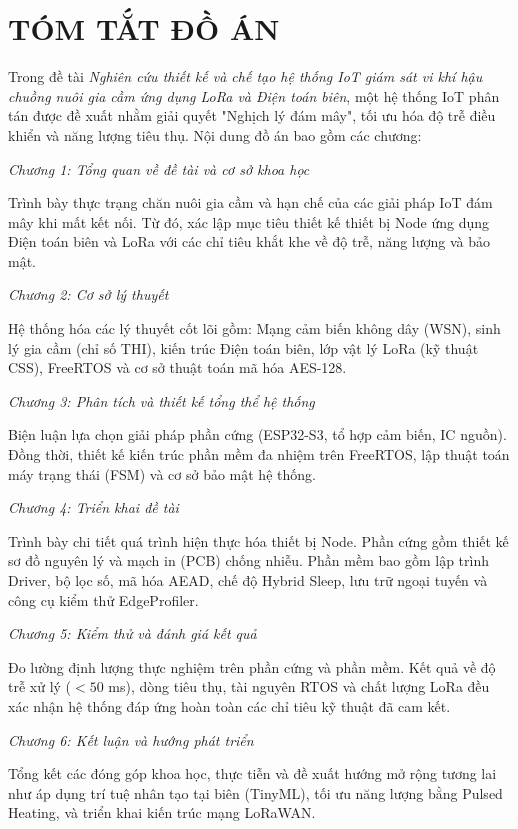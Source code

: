 \section*{TÓM TẮT ĐỒ ÁN}

Trong đề tài \textit{Nghiên cứu thiết kế và chế tạo hệ thống IoT giám sát vi khí hậu chuồng nuôi gia cầm ứng dụng LoRa và Điện toán biên}, một hệ thống IoT phân tán được đề xuất nhằm giải quyết "Nghịch lý đám mây", tối ưu hóa độ trễ điều khiển và năng lượng tiêu thụ. Nội dung đồ án bao gồm các chương: 

\textit{Chương 1: Tổng quan về đề tài và cơ sở khoa học}

Trình bày thực trạng chăn nuôi gia cầm và hạn chế của các giải pháp IoT đám mây khi mất kết nối. Từ đó, xác lập mục tiêu thiết kế thiết bị Node ứng dụng Điện toán biên và LoRa với các chỉ tiêu khắt khe về độ trễ, năng lượng và bảo mật.

\textit{Chương 2: Cơ sở lý thuyết}

Hệ thống hóa các lý thuyết cốt lõi gồm: Mạng cảm biến không dây (WSN), sinh lý gia cầm (chỉ số THI), kiến trúc Điện toán biên, lớp vật lý LoRa (kỹ thuật CSS), FreeRTOS và cơ sở thuật toán mã hóa AES-128.

\textit{Chương 3: Phân tích và thiết kế tổng thể hệ thống}

Biện luận lựa chọn giải pháp phần cứng (ESP32-S3, tổ hợp cảm biến, IC nguồn). Đồng thời, thiết kế kiến trúc phần mềm đa nhiệm trên FreeRTOS, lập thuật toán máy trạng thái (FSM) và cơ sở bảo mật hệ thống.

\textit{Chương 4: Triển khai đề tài}

Trình bày chi tiết quá trình hiện thực hóa thiết bị Node. Phần cứng gồm thiết kế sơ đồ nguyên lý và mạch in (PCB) chống nhiễu. Phần mềm bao gồm lập trình Driver, bộ lọc số, mã hóa AEAD, chế độ Hybrid Sleep, lưu trữ ngoại tuyến và công cụ kiểm thử EdgeProfiler.

\textit{Chương 5: Kiểm thử và đánh giá kết quả}

Đo lường định lượng thực nghiệm trên phần cứng và phần mềm. Kết quả về độ trễ xử lý ($<50$ ms), dòng tiêu thụ, tài nguyên RTOS và chất lượng LoRa đều xác nhận hệ thống đáp ứng hoàn toàn các chỉ tiêu kỹ thuật đã cam kết.

\textit{Chương 6: Kết luận và hướng phát triển}

Tổng kết các đóng góp khoa học, thực tiễn và đề xuất hướng mở rộng tương lai như áp dụng trí tuệ nhân tạo tại biên (TinyML), tối ưu năng lượng bằng Pulsed Heating, và triển khai kiến trúc mạng LoRaWAN.

